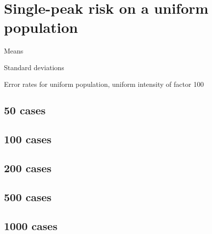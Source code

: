 
\section{Single-peak risk on a uniform population}


\begin{table}[H]
\centering

\begin{subtable}{0.9\textwidth}

\caption{Means} 
\end{subtable}

\begin{subtable}{0.9\textwidth}

\caption{Standard deviations} 
\end{subtable}

\caption{Error rates for uniform population, uniform intensity of factor 100}
\label{tbl:mean_error_rates:unif_100_unif}
\end{table}


\subsection{50 cases}


\subsection{100 cases}


\subsection{200 cases}


\subsection{500 cases}


\subsection{1000 cases}




